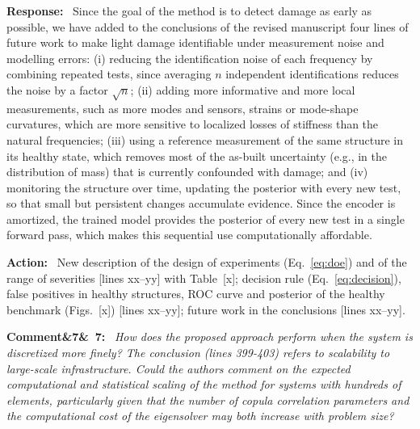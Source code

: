 \documentclass[11pt]{article}
\newenvironment{rcomment}[1]{\par\bigskip\noindent\textbf{Comment\ifx&#1&\else\ #1\fi:}\ \itshape}{\par}
\newenvironment{response}{\par\smallskip\noindent\color{resp}\textbf{Response:}\ }{\par}
\newenvironment{action}{\par\smallskip\noindent\color{resp}\textbf{Action:}\ }{\par}
\newcommand{\tbd}[1]{\textcolor{note}{\textsf{[#1]}}}
\newcommand{\lines}[1]{\tbd{lines #1}}
\begin{document}
\begin{response}
Since the goal of the method is to detect damage as early as possible, we have added to the conclusions of the revised manuscript four lines of future work to make light damage identifiable
under measurement noise and modelling errors: (i) reducing the identification noise of each frequency by combining repeated tests, since averaging $n$ independent identifications reduces the noise by a factor $\sqrt{n}$; (ii) adding more informative and more local measurements, such as more modes and sensors, strains or mode-shape curvatures, which are more sensitive to localized losses of stiffness than the natural frequencies; (iii) using a reference measurement of the same structure in its healthy state, which removes most of the as-built uncertainty (e.g., in the distribution of mass) that is currently confounded with damage; and (iv) monitoring the structure over time, updating the posterior with every new test, so that small but persistent changes accumulate evidence. Since the encoder is amortized, the trained model provides the posterior of every new test in a single forward pass, which makes this sequential use computationally affordable.
\end{response}

\begin{action}
New description of the design of experiments (Eq.~\eqref{eq:doe}) and of the range of severities \lines{xx--yy} with
Table~\tbd{x}; decision rule (Eq.~\eqref{eq:decision}), false positives in healthy structures, ROC curve and posterior of
the healthy benchmark (Figs.~\tbd{x}) \lines{xx--yy}; future work in the conclusions \lines{xx--yy}.
\end{action}

\begin{rcomment}{7}
How does the proposed approach perform when the system is discretized more finely? The conclusion (lines 399-403)
refers to scalability to large-scale infrastructure. Could the authors comment on the expected computational and
statistical scaling of the method for systems with hundreds of elements, particularly given that the number of copula
correlation parameters and the computational cost of the eigensolver may both increase with problem size?
\end{rcomment}
\end{document}
